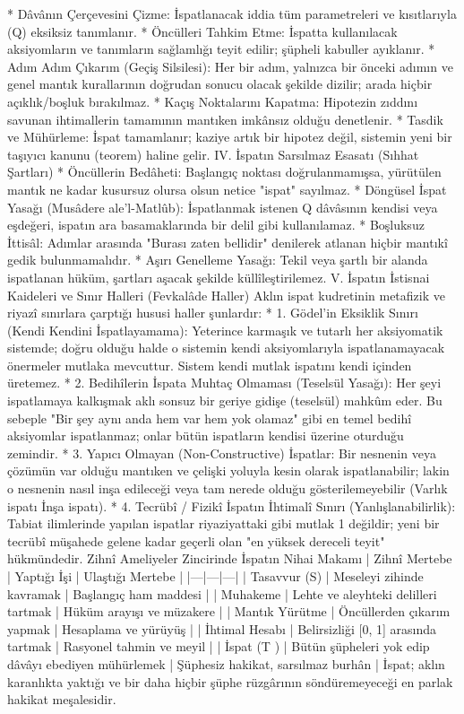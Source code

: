 \documentclass[11pt,a4paper]{article}
\begin{document}
 * Dâvânın Çerçevesini Çizme: İspatlanacak iddia tüm parametreleri ve kısıtlarıyla (Q) eksiksiz tanımlanır.
 * Öncülleri Tahkim Etme: İspatta kullanılacak aksiyomların ve tanımların sağlamlığı teyit edilir; şüpheli kabuller ayıklanır.
 * Adım Adım Çıkarım (Geçiş Silsilesi): Her bir adım, yalnızca bir önceki adımın ve genel mantık kurallarının doğrudan sonucu olacak şekilde dizilir; arada hiçbir açıklık/boşluk bırakılmaz.
 * Kaçış Noktalarını Kapatma: Hipotezin zıddını savunan ihtimallerin tamamının mantıken imkânsız olduğu denetlenir.
 * Tasdik ve Mühürleme: İspat tamamlanır; kaziye artık bir hipotez değil, sistemin yeni bir taşıyıcı kanunu (teorem) haline gelir.
IV. İspatın Sarsılmaz Esasatı (Sıhhat Şartları)
 * Öncüllerin Bedâheti: Başlangıç noktası doğrulanmamışsa, yürütülen mantık ne kadar kusursuz olursa olsun netice "ispat" sayılmaz.
 * Döngüsel İspat Yasağı (Musâdere ale'l-Matlûb): İspatlanmak istenen Q dâvâsının kendisi veya eşdeğeri, ispatın ara basamaklarında bir delil gibi kullanılamaz.
 * Boşluksuz İttisâl: Adımlar arasında "Burası zaten bellidir" denilerek atlanan hiçbir mantıkî gedik bulunmamalıdır.
 * Aşırı Genelleme Yasağı: Tekil veya şartlı bir alanda ispatlanan hüküm, şartları aşacak şekilde küllîleştirilemez.
V. İspatın İstisnai Kaideleri ve Sınır Halleri (Fevkalâde Haller)
Aklın ispat kudretinin metafizik ve riyazî sınırlara çarptığı hususi haller şunlardır:
 * 1. Gödel'in Eksiklik Sınırı (Kendi Kendini İspatlayamama):
   Yeterince karmaşık ve tutarlı her aksiyomatik sistemde; doğru olduğu halde o sistemin kendi aksiyomlarıyla ispatlanamayacak önermeler mutlaka mevcuttur. Sistem kendi mutlak ispatını kendi içinden üretemez.
 * 2. Bedihîlerin İspata Muhtaç Olmaması (Teselsül Yasağı):
   Her şeyi ispatlamaya kalkışmak aklı sonsuz bir geriye gidişe (teselsül) mahkûm eder. Bu sebeple "Bir şey aynı anda hem var hem yok olamaz" gibi en temel bedihî aksiyomlar ispatlanmaz; onlar bütün ispatların kendisi üzerine oturduğu zemindir.
 * 3. Yapıcı Olmayan (Non-Constructive) İspatlar:
   Bir nesnenin veya çözümün var olduğu mantıken ve çelişki yoluyla kesin olarak ispatlanabilir; lakin o nesnenin nasıl inşa edileceği veya tam nerede olduğu gösterilemeyebilir (Varlık ispatı \neq İnşa ispatı).
 * 4. Tecrübî / Fizikî İspatın İhtimalî Sınırı (Yanlışlanabilirlik):
   Tabiat ilimlerinde yapılan ispatlar riyaziyattaki gibi mutlak 1 değildir; yeni bir tecrübî müşahede gelene kadar geçerli olan "en yüksek dereceli teyit" hükmündedir.
Zihnî Ameliyeler Zincirinde İspatın Nihai Makamı
| Zihnî Mertebe | Yaptığı İşi | Ulaştığı Mertebe |
|---|---|---|
| Tasavvur (S) | Meseleyi zihinde kavramak | Başlangıç ham maddesi |
| Muhakeme | Lehte ve aleyhteki delilleri tartmak | Hüküm arayışı ve müzakere |
| Mantık Yürütme | Öncüllerden çıkarım yapmak | Hesaplama ve yürüyüş |
| İhtimal Hesabı | Belirsizliği [0, 1] arasında tartmak | Rasyonel tahmin ve meyil |
| İspat (T ) | Bütün şüpheleri yok edip dâvâyı ebediyen mühürlemek | Şüphesiz hakikat, sarsılmaz burhân |
İspat; aklın karanlıkta yaktığı ve bir daha hiçbir şüphe rüzgârının söndüremeyeceği en parlak hakikat meşalesidir.
\end{document}
